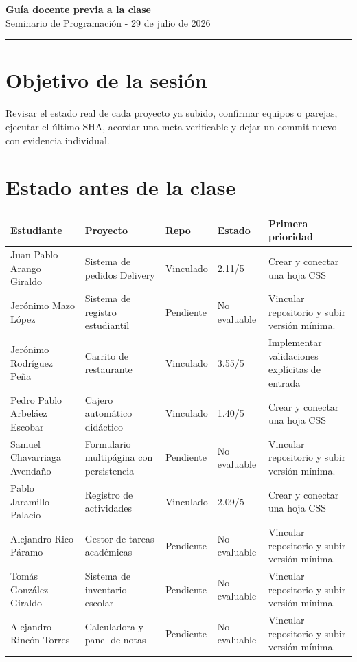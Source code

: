 \documentclass[10pt,a4paper]{article}
\newcommand{\ruleline}{\par\noindent\color{line}\rule{\linewidth}{0.6pt}\color{black}\par}
\begin{document}
\begin{center}
{\color{navy}\Large\bfseries Guía docente previa a la clase}\\[2mm]
{\small Seminario de Programación - 29 de julio de 2026}
\end{center}
\ruleline

\section*{Objetivo de la sesión}
Revisar el estado real de cada proyecto ya subido, confirmar equipos o parejas, ejecutar el último SHA, acordar una meta verificable y dejar un commit nuevo con evidencia individual.
\section*{Estado antes de la clase}
\scriptsize
\begin{longtable}{p{3.0cm}p{2.6cm}p{1.5cm}p{1.5cm}p{5.2cm}}
\toprule
\textbf{Estudiante} & \textbf{Proyecto} & \textbf{Repo} & \textbf{Estado} & \textbf{Primera prioridad}\\
\midrule
Juan Pablo Arango Giraldo & Sistema de pedidos Delivery & Vinculado & 2.11/5 & Crear y conectar una hoja CSS \\
Jerónimo Mazo López & Sistema de registro estudiantil & Pendiente & No evaluable & Vincular repositorio y subir versión mínima. \\
Jerónimo Rodríguez Peña & Carrito de restaurante & Vinculado & 3.55/5 & Implementar validaciones explícitas de entrada \\
Pedro Pablo Arbeláez Escobar & Cajero automático didáctico & Vinculado & 1.40/5 & Crear y conectar una hoja CSS \\
Samuel Chavarriaga Avendaño & Formulario multipágina con persistencia & Pendiente & No evaluable & Vincular repositorio y subir versión mínima. \\
Pablo Jaramillo Palacio & Registro de actividades & Vinculado & 2.09/5 & Crear y conectar una hoja CSS \\
Alejandro Rico Páramo & Gestor de tareas académicas & Pendiente & No evaluable & Vincular repositorio y subir versión mínima. \\
Tomás González Giraldo & Sistema de inventario escolar & Pendiente & No evaluable & Vincular repositorio y subir versión mínima. \\
Alejandro Rincón Torres & Calculadora y panel de notas & Pendiente & No evaluable & Vincular repositorio y subir versión mínima. \\
\bottomrule
\end{longtable}
\normalsize
\end{document}
